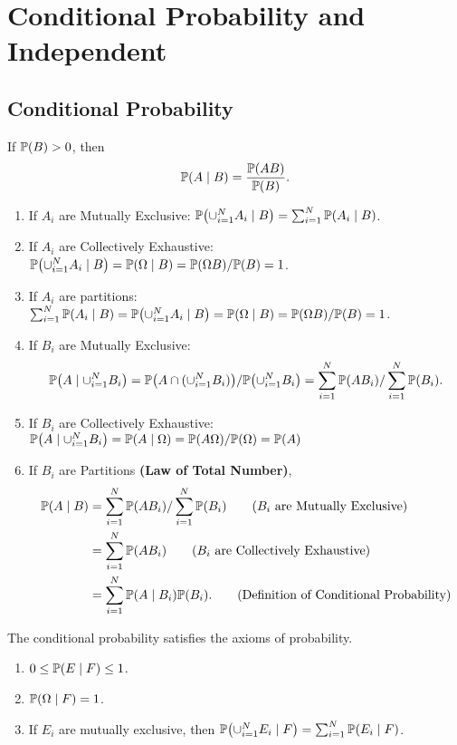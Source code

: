 \chapter{Conditional Probability and Independent}

\section{Conditional Probability}
\begin{theorem}
    If $\P{B}>0$, then
    \[\condP{A}{B} = \frac{\P{AB}}{\P{B}}.\]
\end{theorem}
\begin{enumerate}
    \item If $A_i$ are Mutually Exclusive: $\condP{\cup_{i=1}^{N}A_i}{B} = \sum_{i=1}^{N}\condP{A_i}{B}$.
    \item If $A_i$ are Collectively Exhaustive: $\condP{\cup_{i=1}^N A_i}{B}=\condP{\Omega}{B}=\P{\Omega B}/\P{B}=1$.
    \item If $A_i$ are partitions: $\sum_{i=1}^{N}\condP{A_i}{B}=\condP{\cup_{i=1}^{N}A_i}{B}=\condP{\Omega}{B}=\P{\Omega B}/\P{B}=1$.
    \item If $B_i$ are Mutually Exclusive: \[\condP{A}{\cup_{i=1}^{N}B_i} = \P{A\cap(\cup_{i=1}^N B_i)}/\P{\cup_{i=1}^N B_i}=\sum_{i=1}^{N}\P{AB_i}/\sum_{i=1}^N\P{B_i}.\]
    \item If $B_i$ are Collectively Exhaustive: $\condP{A}{\cup_{i=1}^{N}B_i} = \condP{A}{\Omega}=\P{A\Omega}/\P{\Omega}=\P{A}$
    \item If $B_i$ are Partitions \textbf{(Law of Total Number)},
    \begin{align}
        \condP{A}{B}
        &= \sum_{i=1}^{N}\P{AB_i}/\sum_{i=1}^N\P{B_i} \tag{$B_i$ are Mutually Exclusive} \\
        &= \sum_{i=1}^{N}\P{AB_i}  \tag{$B_i$ are Collectively Exhaustive} \\
        &= \sum_{i=1}^{N}\condP{A}{B_i}\P{B_i}. \tag{Definition of Conditional Probability}
    \end{align}
\end{enumerate}

\begin{theorem}
    The conditional probability satisfies the axioms of probability.
    \begin{enumerate}
        \item $0\leq\condP{E}{F}\leq 1$.
        \item $\condP{\Omega}{F}=1$.
        \item If $E_i$ are mutually exclusive, then $\condP{\cup_{i=1}^{N}E_i}{F}=\sum_{i=1}^{N}\condP{E_i}{F}$.
    \end{enumerate}
\end{theorem}

